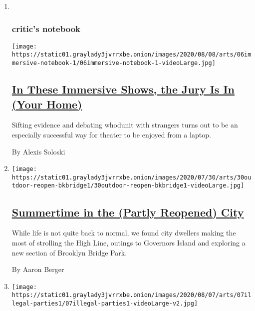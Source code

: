 \begin{enumerate}
\def\labelenumi{\arabic{enumi}.}
\item ~
  \hypertarget{critics-notebook}{%
  \subsubsection{critic's notebook}\label{critics-notebook}}

  \texttt{[image: https://static01.graylady3jvrrxbe.onion/images/2020/08/08/arts/06immersive-notebook-1/06immersive-notebook-1-videoLarge.jpg]}

  \hypertarget{in-these-immersive-shows-the-jury-is-in-your-home}{%
  \subsection{\texorpdfstring{\href{/2020/08/07/theater/immersive-shows-jury-duty-eschaton.html}{In
  These Immersive Shows, the Jury Is In (Your
  Home)}}{In These Immersive Shows, the Jury Is In (Your Home)}}\label{in-these-immersive-shows-the-jury-is-in-your-home}}

  Sifting evidence and debating whodunit with strangers turns out to be
  an especially successful way for theater to be enjoyed from a laptop.

  By Alexis Soloski
\item
  \texttt{[image: https://static01.graylady3jvrrxbe.onion/images/2020/07/30/arts/30outdoor-reopen-bkbridge1/30outdoor-reopen-bkbridge1-videoLarge.jpg]}

  \hypertarget{summertime-in-the-partly-reopened-city}{%
  \subsection{\texorpdfstring{\href{/2020/08/07/arts/design/high-line-governors-island-brooklyn-bridge-park.html}{Summertime
  in the (Partly Reopened)
  City}}{Summertime in the (Partly Reopened) City}}\label{summertime-in-the-partly-reopened-city}}

  While life is not quite back to normal, we found city dwellers making
  the most of strolling the High Line, outings to Governors Island and
  exploring a new section of Brooklyn Bridge Park.

  By Aaron Berger
\item
  \texttt{[image: https://static01.graylady3jvrrxbe.onion/images/2020/08/07/arts/07illegal-parties1/07illegal-parties1-videoLarge-v2.jpg]}

  \hypertarget{at-europes-illegal-parties-the-virus-is-the-last-thing-on-anyones-mind}{%
}
\end{enumerate}
